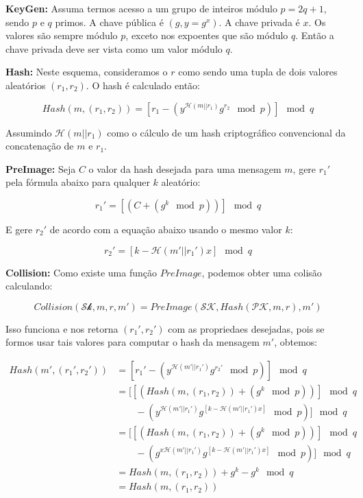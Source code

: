 \documentclass[a4paper]{article}
\begin{document}
\textbf{KeyGen: }Assuma termos acesso a um grupo de inteiros módulo
$p=2q+1$, sendo $p$ e $q$ primos. A chave pública é $(g, y=g^x)$. A
chave privada é $x$. Os valores são sempre módulo $p$, exceto nos
expoentes que são módulo $q$. Então a chave privada deve ser vista
como um valor módulo $q$.

\textbf{Hash: }Neste esquema, consideramos o $r$ como sendo uma tupla
de dois valores aleatórios $(r_1, r_2)$. O hash é calculado então:

$$ Hash(m, (r_1, r_2)) = \left[r_1-(y^{\mathcal{H}(m||r_1)}g^{r_2}
  \mod p)\right] \mod q
$$

Assumindo $\mathcal{H}(m||r_1)$ como o cálculo de um hash
criptográfico convencional da concatenação de $m$ e $r_1$.

\textbf{PreImage:} Seja $C$ o valor da hash desejada para uma
mensagem $m$, gere $r_1'$ pela fórmula abaixo para qualquer $k$
aleatório:

$$
r_1' = \left[(C + (g^k \mod p))\right] \mod q
$$

E gere $r_2'$ de acordo com a equação abaixo usando o mesmo valor $k$:

$$
r_2' = \left[k-\mathcal{H}(m'||r_1')x\right] \mod q
$$

\textbf{Collision:} Como existe uma função $PreImage$, podemos
obter uma colisão calculando:

$$ Collision(\mathcal{Sk}, m, r, m') = PreImage(\mathcal{SK},
Hash(\mathcal{PK}, m, r), m')
$$

Isso funciona e nos retorna $(r_1', r_2')$ com as propriedaes
desejadas, pois se formos usar tais valores para computar o hash da
mensagem $m'$, obtemos:

\begin{equation}
\begin{split}
  Hash(m', (r_1', r_2')) &= \left[r_1'-(y^{\mathcal{H}(m'||r_1')}g^{r_2'} \mod p)\right] \mod q\\
  &=\big[\left[(Hash(m, (r_1, r_2)) + (g^k \mod p))\right] \mod q\\
    &\qquad-(y^{\mathcal{H}(m'||r_1')}g^{[k-\mathcal{H}(m'||r_1')x]} \mod p)\big] \mod q\\
  &=\big[\left[(Hash(m, (r_1, r_2)) + (g^k \mod p))\right] \mod q\\
    &\qquad-(g^{x\mathcal{H}(m'||r_1')}g^{[k-\mathcal{H}(m'||r_1')x]} \mod p)\big] \mod q\\
  &= Hash(m, (r_1, r_2)) + g^k - g^k \mod q\\
  &= Hash(m, (r_1, r_2))
\end{split}
\end{equation}
\end{document}
